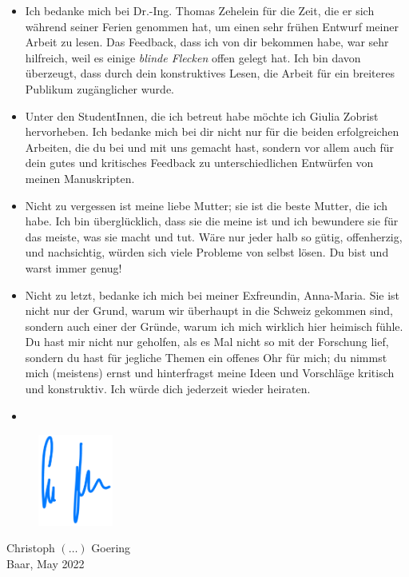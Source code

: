 \begin{itemize}[label=$\succ$]
  \item Ich bedanke mich bei Dr.-Ing. Thomas Zehelein für die Zeit, die er sich 
    während seiner Ferien genommen hat, um einen sehr frühen Entwurf meiner 
    Arbeit zu lesen. Das Feedback, dass ich von dir bekommen habe, war sehr 
    hilfreich, weil es einige \emph{blinde Flecken} offen gelegt hat. Ich bin 
    davon überzeugt, dass durch dein konstruktives Lesen, die Arbeit für ein 
    breiteres Publikum zugänglicher wurde.

  \item Unter den StudentInnen, die ich betreut habe möchte ich Giulia Zobrist 
    hervorheben. Ich bedanke mich bei dir nicht nur für die beiden 
    erfolgreichen Arbeiten, die du bei und mit uns gemacht hast, sondern vor 
    allem auch für dein gutes und kritisches Feedback zu unterschiedlichen 
    Entwürfen von meinen Manuskripten.

  \item Nicht zu vergessen ist meine liebe Mutter; sie ist die beste Mutter, 
    die ich habe. Ich bin überglücklich, dass sie die meine ist und ich 
    bewundere sie für das meiste, was sie macht und tut. Wäre nur jeder halb so 
    gütig, offenherzig, und nachsichtig, würden sich viele Probleme von selbst 
    lösen. Du bist und warst immer genug!

  \item Nicht zu letzt, bedanke ich mich bei meiner Exfreundin, Anna-Maria. Sie 
  ist nicht nur der Grund, warum wir überhaupt in die Schweiz gekommen sind, 
  sondern auch einer der Gründe, warum ich mich wirklich hier heimisch fühle. 
  Du hast mir nicht nur geholfen, als es Mal nicht so mit der Forschung lief, 
  sondern du hast für jegliche Themen ein offenes Ohr für mich; du nimmst mich 
  (meistens) ernst und hinterfragst meine Ideen und Vorschläge kritisch und 
  konstruktiv. Ich würde dich jederzeit wieder heiraten.

  \item

\end{itemize}

\vspace*{\fill}

\begin{flushleft}
\begin{figure}[h]
\begin{flushleft}
 \hspace{1 cm}
 \includegraphics[height=3cm]{Unterschrift.png}
\end{flushleft}
\end{figure}
\vspace{-0.1 cm}
\hspace{1 cm} Christoph $(\ldots)$ Goering\\
\hspace{1 cm} Baar, May 2022
\end{flushleft}
